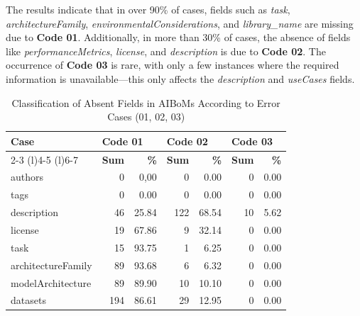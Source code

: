 \documentclass[12pt,a4paper, oneside, openright]{book}
\newcommand{\aiboms}{{AIBoMs}\xspace}
\begin{document}
The results indicate that in over 90\% of cases, fields such as \textit{task}, \textit{architectureFamily}, \textit{environmentalConsiderations}, and \textit{library\_name} are missing due to \textbf{Code 01}. Additionally, in more than 30\% of cases, the absence of fields like  \textit{performanceMetrics}, \textit{license}, and \textit{description} is due to \textbf{Code 02}. The occurrence of \textbf{Code 03} is rare, with only a few instances where the required information is unavailable—this only affects the \textit{description} and \textit{useCases} fields.
\begin{table}[!h]
\centering
\caption{Classification of Absent Fields in \aiboms According to Error Cases (01, 02, 03)}
\label{tab:classAbsFields}
\begin{tabular}{lrrrrrr}
\toprule
\multirow{2.5}{*}{\textbf{Case}} & \multicolumn{2}{l}{\textbf{Code 01}} & \multicolumn{2}{l}{\textbf{Code 02}} & \multicolumn{2}{l}{\textbf{Code 03}} \\
\cmidrule{2-3} \cmidrule(l){4-5} \cmidrule(l){6-7}
                               & \textbf{Sum}      & \textbf{\%}      & \textbf{Sum}      & \textbf{\%}      & \textbf{Sum}      & \textbf{\%}      \\
\midrule
authors                        & 0                 & 0,00           & 0                 & 0.00           & 0                 & 0.00           \\
tags                           & 0                 & 0.00           & 0                 & 0.00           & 0                 & 0.00           \\
description                    & 46                & 25.84          & 122               & 68.54          & 10                & 5.62           \\
license                        & 19                & 67.86          & 9                 & 32.14          & 0                 & 0.00           \\
task                           & 15                & 93.75          & 1                 & 6.25           & 0                 & 0.00           \\
architectureFamily             & 89                & 93.68          & 6                 & 6.32           & 0                 & 0.00           \\
modelArchitecture              & 89                & 89.90          & 10                & 10.10          & 0                 & 0.00           \\
datasets                       & 194               & 86.61          & 29                & 12.95          & 0                 & 0.00           \\

\end{tabular}
\end{table}
\end{document}
